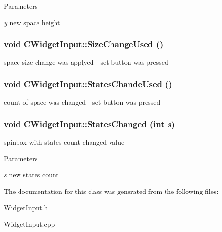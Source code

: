 \begin{DoxyParams}{Parameters}
\item[{\em y}]new space height \end{DoxyParams}
\hypertarget{classCWidgetInput_a5c7632de26c6a99e30aea469305412d1}{
\subsubsection[{SizeChangeUsed}]{\setlength{\rightskip}{0pt plus 5cm}void CWidgetInput::SizeChangeUsed ()}}
\label{classCWidgetInput_a5c7632de26c6a99e30aea469305412d1}
space size change was applyed -\/ set button was pressed \hypertarget{classCWidgetInput_accbc250762c28fe7b5b49f70e244342a}{
\subsubsection[{StatesChandeUsed}]{\setlength{\rightskip}{0pt plus 5cm}void CWidgetInput::StatesChandeUsed ()}}
\label{classCWidgetInput_accbc250762c28fe7b5b49f70e244342a}
count of space was changed -\/ set button was pressed \hypertarget{classCWidgetInput_a8ae1871cbd815138e3eca28256b4e16f}{
\subsubsection[{StatesChanged}]{\setlength{\rightskip}{0pt plus 5cm}void CWidgetInput::StatesChanged (int {\em s})}}
\label{classCWidgetInput_a8ae1871cbd815138e3eca28256b4e16f}
spinbox with states count changed value


\begin{DoxyParams}{Parameters}
\item[{\em s}]new states count \end{DoxyParams}


The documentation for this class was generated from the following files:\begin{DoxyCompactItemize}
\item 
WidgetInput.h\item 
WidgetInput.cpp\end{DoxyCompactItemize}
